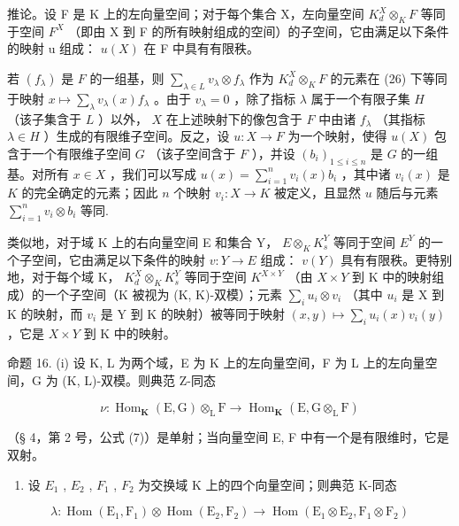 推论。设 F 是 K 上的左向量空间；对于每个集合 X，左向量空间 \(K_{d}^{X} \otimes_{K} F\) 等同于空间 \(F^{X}\) （即由 X 到 F 的所有映射组成的空间）的子空间，它由满足以下条件的映射 u 组成： \(u(X)\) 在 F 中具有有限秩。

若 \((f_{\lambda})\) 是 \(F\) 的一组基，则 \(\sum_{\lambda \in L} v_{\lambda} \otimes f_{\lambda}\) 作为 \(K_d^X \otimes_K F\) 的元素在 (26) 下等同于映射 \(x \mapsto \sum_{\lambda} v_{\lambda}(x)f_{\lambda}\) 。由于 \(v_{\lambda} = 0\) ，除了指标 \(\lambda\) 属于一个有限子集 \(H\) （该子集含于 \(L\) ）以外， \(X\) 在上述映射下的像包含于 \(F\) 中由诸 \(f_{\lambda}\) （其指标 \(\lambda \in H\) ）生成的有限维子空间。反之，设 \(u: X \to F\) 为一个映射，使得 \(u(X)\) 包含于一个有限维子空间 \(G\) （该子空间含于 \(F\) ），并设 \((b_i)_{1 \leqslant i \leqslant n}\) 是 \(G\) 的一组基。对所有 \(x \in X\) ，我们可以写成 \(u(x) = \sum_{i=1}^{n} v_i(x)b_i\) ，其中诸 \(v_i(x)\) 是 \(K\) 的完全确定的元素；因此 \(n\) 个映射 \(v_i: X \to K\) 被定义，且显然 \(u\) 随后与元素 \(\sum_{i=1}^{n} v_i \otimes b_i\) 等同.

类似地，对于域 K 上的右向量空间 E 和集合 Y， \(E \otimes_{K} K_{s}^{Y}\) 等同于空间 \(E^{Y}\) 的一个子空间，它由满足以下条件的映射 \(v: Y \to E\) 组成： \(v(Y)\) 具有有限秩。更特别地，对于每个域 K， \(K_{d}^{X} \otimes_{K} K_{s}^{Y}\) 等同于空间 \(K^{X \times Y}\) （由 \(X \times Y\) 到 K 中的映射组成）的一个子空间（K 被视为 (K, K)-双模）；元素 \(\sum_{i} u_{i} \otimes v_{i}\) （其中 \(u_{i}\) 是 X 到 K 的映射，而 \(v_{i}\) 是 Y 到 K 的映射）被等同于映射 \((x, y) \mapsto \sum_{i} u_{i}(x) v_{i}(y)\) ，它是 \(X \times Y\) 到 K 中的映射。

命题 16. (i) 设 K, L 为两个域，E 为 K 上的左向量空间，F 为 L 上的左向量空间，G 为 (K, L)-双模。则典范 Z-同态

\[
\nu : \operatorname{Hom} _ {\mathbf {K}} (\mathrm{E}, \mathrm{G}) \otimes_ {\mathrm{L}} \mathrm{F} \rightarrow \operatorname{Hom} _ {\mathbf {K}} (\mathrm{E}, \mathrm{G} \otimes_ {\mathrm{L}} \mathrm{F})\tag{27}
\]

（§ 4，第 2 号，公式 (7)）是单射；当向量空间 E, F 中有一个是有限维时，它是双射。

\begin{enumerate}
\def\labelenumi{(\roman{enumi})}
\setcounter{enumi}{1}
\tightlist
\item
  设 \(E_{1}\) , \(E_{2}\) , \(F_{1}\) , \(F_{2}\) 为交换域 K 上的四个向量空间；则典范 K-同态
\end{enumerate}

\[
\lambda : \operatorname{Hom} \left(\mathrm{E} _ {1}, \mathrm{F} _ {1}\right) \otimes \operatorname{Hom} \left(\mathrm{E} _ {2}, \mathrm{F} _ {2}\right)\rightarrow \operatorname{Hom} \left(\mathrm{E} _ {1} \otimes \mathrm{E} _ {2}, \mathrm{F} _ {1} \otimes \mathrm{F} _ {2}\right)\tag{28}
\]

